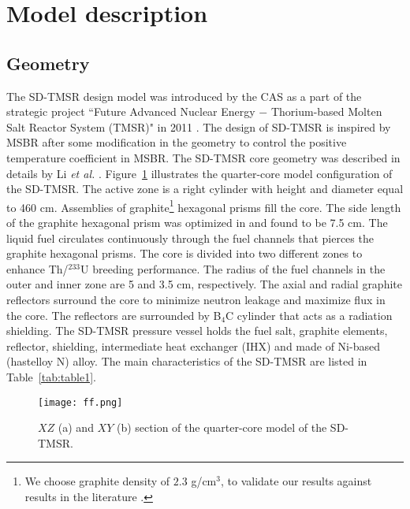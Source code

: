 \section{Model description} \label{Model-description}
\subsection{Geometry}
The \gls{SD-TMSR} design model was introduced by the \gls{CAS} as a part of  
the strategic project ``Future Advanced Nuclear Energy $-$ Thorium-based 
Molten Salt Reactor System (TMSR)" in 2011 
\cite{li_optimization_2018,jiang2012advanced,li2015analysis,li2017model}. The 
design of \gls{SD-TMSR} is inspired by \gls{MSBR} 
\cite{robertson_conceptual_1971} after some modification in the geometry to 
control the positive temperature coefficient in MSBR. The \gls{SD-TMSR} core 
geometry was described in details by Li \emph{et al.} 
\cite{li_optimization_2018}.
Figure~\ref{fig:ff} illustrates the quarter-core model configuration of the 
\gls{SD-TMSR}. The active zone is a right cylinder with height and diameter 
equal to 460 cm. Assemblies of graphite\footnote{We choose graphite density of 
$2.3$ g/cm$^3$, to validate our results against results in the literature 
\cite{li_optimization_2018,nuttin2005potential}.} hexagonal prisms fill the 
core. The side length of the graphite hexagonal prism was optimized in 
\cite{li_optimization_2018} and found to be 7.5 cm. The liquid fuel circulates 
continuously through the fuel channels that pierces the graphite hexagonal 
prisms. The core is divided into two different zones to enhance 
Th/$^{233}$U breeding performance. The radius of the fuel channels in the 
outer and inner zone are 5 and 3.5 cm, respectively. The axial and radial 
graphite reflectors surround the core to minimize neutron leakage and 
maximize flux in the core. The reflectors are surrounded by B${_4}$C cylinder 
that acts as a radiation shielding. The \gls{SD-TMSR} pressure vessel holds 
the fuel salt, graphite elements, reflector, shielding, intermediate heat 
exchanger (IHX) and made of Ni-based (hastelloy N) alloy. The main 
characteristics of the \gls{SD-TMSR} are listed in Table~\ref{tab:table1}.

\begin{figure} %
	\texttt{[image: ff.png]}
	\caption{$XZ$ (a) and $XY$ (b) section of the quarter-core model of the 
	SD-TMSR.}
	\label{fig:ff}
\end{figure}

